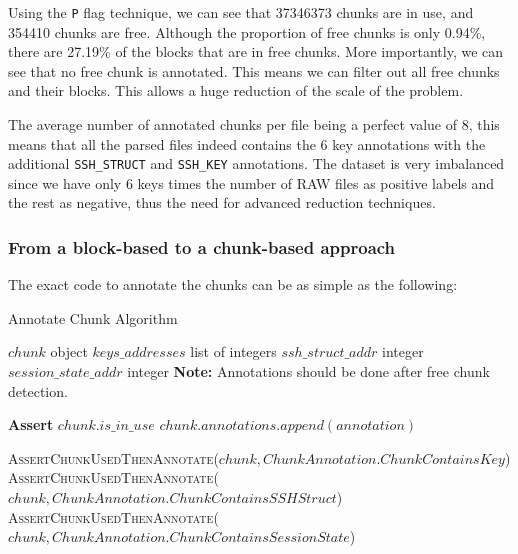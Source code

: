     Using the \texttt{P} flag technique, we can see that 37346373 chunks are in use, and 354410 chunks are free. Although the proportion of free chunks is only 0.94\%, there are 27.19\% of the blocks that are in free chunks. More importantly, we can see that no free chunk is annotated. This means we can filter out all free chunks and their blocks. This allows a huge reduction of the scale of the problem. 
    
    The average number of annotated chunks per file being a perfect value of 8, this means that all the parsed files indeed contains the 6 key annotations with the additional \texttt{SSH\_STRUCT} and \texttt{SSH\_KEY} annotations. The dataset is very imbalanced since we have only 6 keys times the number of RAW files as positive labels and the rest as negative, thus the need for advanced reduction techniques. 

    \subsubsection{From a block-based to a chunk-based approach}
    
    The exact code to annotate the chunks can be as simple as the following:

    \begin{algorithm}[H]
        \caption{Annotate Chunk Algorithm}
        \begin{algorithmic}[1]
            \Ensure $chunk$ object
            \Ensure $keys\_addresses$ list of integers
            \Ensure $ssh\_struct\_addr$ integer
            \Ensure $session\_state\_addr$ integer
            \State \textbf{Note:} Annotations should be done after free chunk detection.
            
                \State \textbf{Assert} $chunk.is\_in\_use$ 
                \State $chunk.annotations.append(annotation)$
            \EndProcedure
            
                \State \textsc{AssertChunkUsedThenAnnotate}($chunk, ChunkAnnotation.ChunkContainsKey$)
                \State \textsc{AssertChunkUsedThenAnnotate}($chunk, ChunkAnnotation.ChunkContainsSSHStruct$)
                \State \textsc{AssertChunkUsedThenAnnotate}($chunk, ChunkAnnotation.ChunkContainsSessionState$)
            \EndIf
        \EndProcedure
        \end{algorithmic}
    \end{algorithm}
    
